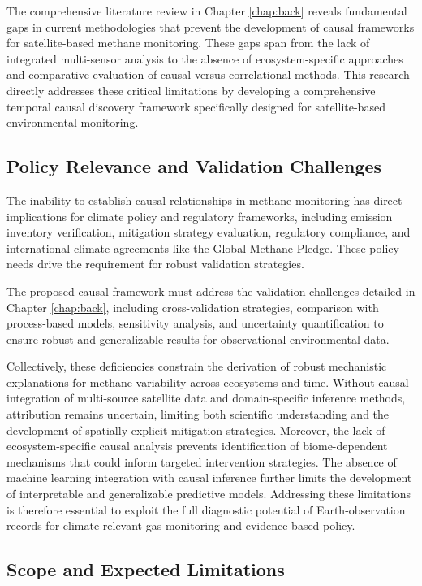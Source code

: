 The comprehensive literature review in Chapter \ref{chap:back} reveals fundamental gaps in current methodologies that prevent the development of causal frameworks for satellite-based methane monitoring. These gaps span from the lack of integrated multi-sensor analysis to the absence of ecosystem-specific approaches and comparative evaluation of causal versus correlational methods. This research directly addresses these critical limitations by developing a comprehensive temporal causal discovery framework specifically designed for satellite-based environmental monitoring.

\subsection{Policy Relevance and Validation Challenges}

The inability to establish causal relationships in methane monitoring has direct implications for climate policy and regulatory frameworks, including emission inventory verification, mitigation strategy evaluation, regulatory compliance, and international climate agreements like the Global Methane Pledge. These policy needs drive the requirement for robust validation strategies.

The proposed causal framework must address the validation challenges detailed in Chapter \ref{chap:back}, including cross-validation strategies, comparison with process-based models, sensitivity analysis, and uncertainty quantification to ensure robust and generalizable results for observational environmental data.

Collectively, these deficiencies constrain the derivation of robust mechanistic explanations for methane variability across ecosystems and time. Without causal integration of multi-source satellite data and domain-specific inference methods, attribution remains uncertain, limiting both scientific understanding and the development of spatially explicit mitigation strategies. Moreover, the lack of ecosystem-specific causal analysis prevents identification of biome-dependent mechanisms that could inform targeted intervention strategies. The absence of machine learning integration with causal inference further limits the development of interpretable and generalizable predictive models. Addressing these limitations is therefore essential to exploit the full diagnostic potential of Earth-observation records for climate-relevant gas monitoring and evidence-based policy.

\subsection{Scope and Expected Limitations}

